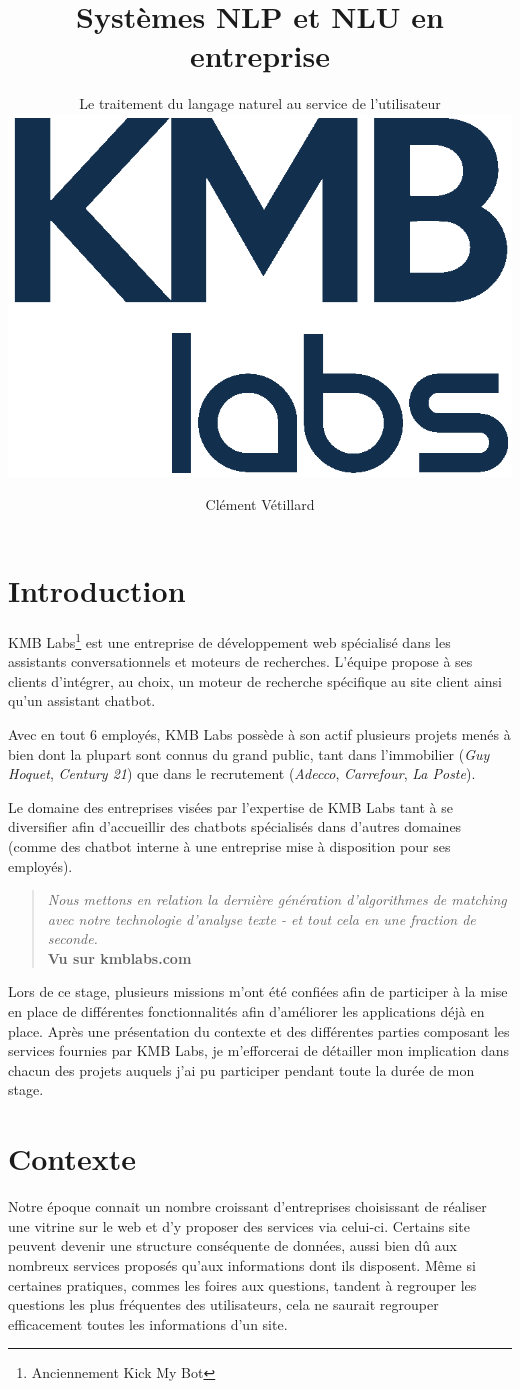 \documentclass[12pt,a4paper,twoside]{scrreprt}
\title{Systèmes NLP et NLU en entreprise}
\subtitle{
Le traitement du langage naturel au service de l'utilisateur\\
	\vspace{0.3cm}
\includegraphics[scale=0.8]{pictures/kmb}
}
\author{Clément Vétillard}
\date{\vfill}
\begin{document}
\maketitle

\abstract{}

\tableofcontents
\thispagestyle{empty}

\chapter*{Introduction}
KMB Labs\footnote{Anciennement Kick My Bot} est une entreprise de développement web spécialisé dans les assistants conversationnels et moteurs de recherches. L'équipe propose à ses clients d'intégrer, au choix, un moteur de recherche spécifique au site client ainsi qu'un assistant chatbot.

Avec en tout 6 employés, KMB Labs possède à son actif plusieurs projets menés à bien dont la plupart sont connus du grand public, tant dans l'immobilier (\textit{Guy Hoquet}, \textit{Century 21}) que dans le recrutement (\textit{Adecco}, \textit{Carrefour}, \textit{La Poste}).

Le domaine des entreprises visées par l'expertise de KMB Labs tant à se diversifier afin d'accueillir des chatbots spécialisés dans d'autres domaines (comme des chatbot interne à une entreprise mise à disposition pour ses employés).

\begin{quote}
	\og \textit{Nous mettons en relation la dernière génération d'algorithmes de matching avec notre technologie d'analyse texte - et tout cela en une fraction de seconde.}\fg{}\\
	\textbf{Vu sur kmblabs.com}
\end{quote}

Lors de ce stage, plusieurs missions m'ont été confiées afin de participer à la mise en place de différentes fonctionnalités afin d'améliorer les applications déjà en place. Après une présentation du contexte et des différentes parties composant les services fournies par KMB Labs, je m'efforcerai de détailler mon implication dans chacun des projets auquels j'ai pu participer pendant toute la durée de mon stage.

\chapter{Contexte}
Notre époque connait un nombre croissant d'entreprises choisissant de réaliser une vitrine sur le web et d'y proposer des services via celui-ci. Certains site peuvent devenir une structure conséquente de données, aussi bien dû aux nombreux services proposés qu'aux informations dont ils disposent. Même si certaines pratiques, commes les foires aux questions, tandent à regrouper les questions les plus fréquentes des utilisateurs, cela ne saurait regrouper efficacement toutes les informations d'un site.
\end{document}

